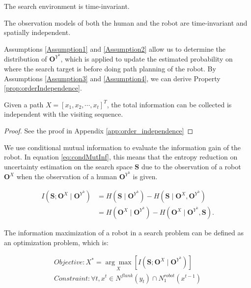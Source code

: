 \documentclass[12pt]{article}
\begin{document}
\begin{Hyp}
\label{Assumption3}
The search environment is time-invariant.
\end{Hyp}

\begin{Hyp}
\label{Assumption4}
The observation models of both the human and the robot are time-invariant and spatially independent.
\end{Hyp}

Assumptions \ref{Assumption1} and \ref{Assumption2} allow us to determine the distribution of $ \mathbf{O}^{Y^{h}} $, which is applied to update the estimated probability on where the search target is before doing path planning of the robot.
By Assumptions \ref{Assumption3} and \ref{Assumption4}, we can derive Property \ref{prop:orderIndependence}.

\begin{propty}
\label{prop:orderIndependence}
Given a path $ X = [ x_{1}, x_{2} , \cdots , x_{t} ]^{T} $, the total information can be collected is independent with the visiting sequence.
\begin{proof}
See the proof in Appendix \ref{app:order_independence}
\end{proof}
\end{propty}


We use conditional mutual information to evaluate the information gain of the robot.
In equation \eqref{eq:condMutInf}, this means that the entropy reduction on uncertainty estimation on the search space $ \mathbf{S} $ due to the observation of a robot $ \mathbf{O}^{X} $ when the observation of a human $ \mathbf{O}^{Y^{h}} $ is given.

\begin{equation}
\label{eq:condMutInf}
\begin{aligned}
I(\mathbf{S}; \mathbf{O}^{X} \mid \mathbf{O}^{Y^{h}}) & = H(\mathbf{S} \mid \mathbf{O}^{Y^{h}}) - H(\mathbf{S} \mid \mathbf{O}^{X},\mathbf{O}^{Y^{h}})\\
& = H(\mathbf{O}^{X} \mid \mathbf{O}^{Y^{h}}) - H(\mathbf{O}^{X} \mid \mathbf{O}^{Y^{h}}, \mathbf{S}).
\end{aligned}
\end{equation}

The information maximization of a robot in a search problem can be defined as an optimization problem, which is:

\begin{equation}
\label{eq:objFunc}
\begin{aligned}
Objective: X^{*} = \underset{X}{\arg\max} [I(\mathbf{S}; \mathbf{O}^{X} \mid \mathbf{O}^{Y^{h}})] \\
Constraint: \forall t, x^{t} \in N^{flank}(y_{t}) \cap N^{robot}_{1}(x^{t-1}) 
\end{aligned}
\end{equation}
\end{document}
